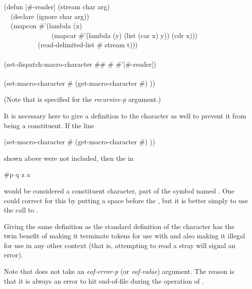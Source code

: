 \begin{defun}[Function]

\begin{lisp}
(defun |\#{\Xlbrace}-reader| (stream char arg) \\
~~(declare (ignore char arg)) \\
~~(mapcon \#'(lambda (x) \\
~~~~~~~~~~~~~~(mapcar \#'(lambda (y) (list (car x) y)) (cdr x))) \\
~~~~~~~~~~(read-delimited-list \#{\Xbackslash}{\Xrbrace} stream t))) \\
 \\
(set-dispatch-macro-character \#{\Xbackslash}\# \#{\Xbackslash}{\Xlbrace} \#'|\#{\Xlbrace}-reader|) \\
 \\
(set-macro-character \#{\Xbackslash}{\Xrbrace} (get-macro-character \#{\Xbackslash}) {\nil}))
\end{lisp}
(Note that {\true} is specified for the {\it recursive-p} argument.)

It is necessary here to give a definition to the character \cd{{\Xrbrace}} as
well to prevent it from being a constituent.
If the line
\begin{lisp}
(set-macro-character \#{\Xbackslash}{\Xrbrace} (get-macro-character \#{\Xbackslash}) {\nil}))
\end{lisp}
shown above were not included, then the \cd{{\Xrbrace}} in
\begin{lisp}
\#{\Xlbrace}p q z a{\Xrbrace}
\end{lisp}
would be considered a constituent character, part of the symbol named
.  One could correct for this by putting a space before
the \cd{{\Xrbrace}}, but it is better simply to use the call to
.

Giving \cd{{\Xrbrace}} the same
definition as the standard definition of the character \cd{)} has the
twin benefit of making it terminate tokens for use with 
and also making it illegal for use in any other context (that is, attempting to
read a stray \cd{{\Xrbrace}} will signal an error).

Note that  does not take an {\it eof-error-p}
(or {\it eof-value})
argument.  The reason is that it is always an error
to hit end-of-file during the operation of .
\end{defun}

